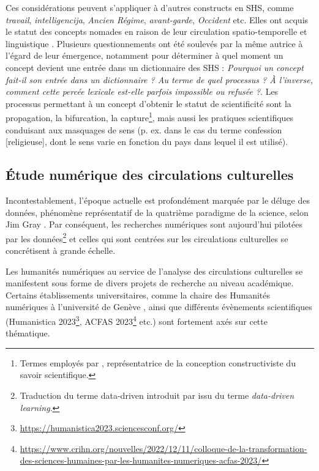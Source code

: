Ces considérations peuvent s'appliquer à d'autres constructs en SHS, comme \textit{travail}, \textit{intelligencija}, \textit{Ancien Régime}, \textit{avant-garde}, \textit{Occident} etc. Elles ont acquis le statut des concepts \og{}nomades\fg{} en raison de leur circulation spatio-temporelle et linguistique \citep[p. 117]{ghermani2011}. Plusieurs questionnements ont été soulevés par la même autrice à l'égard de leur émergence, notamment pour déterminer à quel moment un concept devient une entrée dans un dictionnaire des \textsc{SHS} : \og{}\textit{Pourquoi un concept fait-il son entrée dans un dictionnaire ? Au terme de quel processus ? À l'inverse, comment cette percée lexicale est-elle parfois impossible ou refusée ?}\fg{}. Les processus permettant à un concept d'obtenir le statut de scientificité sont la propagation, la bifurcation, la capture\footnote{Termes employés par \citet{stengers1987d}, représentatrice de la conception constructiviste du savoir scientifique.}, mais aussi les pratiques scientifiques conduisant aux masquages de sens (p. ex. dans le cas du terme \og{}confession [religieuse]\fg{}, dont le sens varie en fonction du pays dans lequel il est utilisé).



\subsection{Étude numérique des circulations culturelles}
Incontestablement, l'époque actuelle est profondément marquée par le \og{}déluge des données\fg{}, phénomène représentatif de la quatrième paradigme de la science, selon Jim Gray \citep{hey2009jim}. Par conséquent, les recherches numériques sont aujourd'hui \og{}pilotées par les données\fg{}\footnote{Traduction du terme \og{}data-driven\fg{} introduit par \citep{Johns1991ShouldYB} issu du terme \textit{data-driven learning}.} et celles qui sont centrées sur les circulations culturelles se concrétisent à grande échelle.

Les humanités numériques au service de l'analyse des circulations culturelles se manifestent sous forme de divers projets de recherche au niveau académique. Certains établissements universitaires, comme la chaire des Humanités numériques à l'université de Genève \citep{joyeux2022circulations}, ainsi que différents évènements scientifiques  (Humanistica 2023\footnote{\url{https://humanistica2023.sciencesconf.org/}}, \textsc{ACFAS} 2023\footnote{\url{https://www.crihn.org/nouvelles/2022/12/11/colloque-de-la-transformation-des-sciences-humaines-par-les-humanites-numeriques-acfas-2023/}} etc.) sont fortement axés sur cette thématique.  

%
